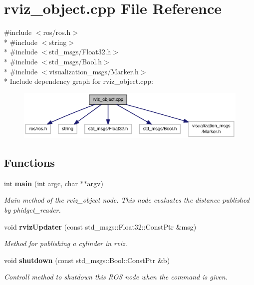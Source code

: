\section{rviz\-\_\-object.\-cpp File Reference}
\label{rviz__object_8cpp}
{\ttfamily \#include $<$ros/ros.\-h$>$}\\*
{\ttfamily \#include $<$string$>$}\\*
{\ttfamily \#include $<$std\-\_\-msgs/\-Float32.\-h$>$}\\*
{\ttfamily \#include $<$std\-\_\-msgs/\-Bool.\-h$>$}\\*
{\ttfamily \#include $<$visualization\-\_\-msgs/\-Marker.\-h$>$}\\*
Include dependency graph for rviz\-\_\-object.\-cpp\-:\nopagebreak
\begin{figure}[H]
\begin{center}
\leavevmode
\includegraphics[width=350pt]{rviz__object_8cpp__incl}
\end{center}
\end{figure}
\subsection*{Functions}
\begin{DoxyCompactItemize}
\item 
int {\bf main} (int argc, char $\ast$$\ast$argv)
\begin{DoxyCompactList}\small\item\em Main method of the rviz\-\_\-object node. This node evaluates the distance published by phidget\-\_\-reader. \end{DoxyCompactList}\item 
void {\bf rviz\-Updater} (const std\-\_\-msgs\-::\-Float32\-::\-Const\-Ptr \&msg)
\begin{DoxyCompactList}\small\item\em Method for publishing a cylinder in rviz. \end{DoxyCompactList}\item 
void {\bf shutdown} (const std\-\_\-msgs\-::\-Bool\-::\-Const\-Ptr \&b)
\begin{DoxyCompactList}\small\item\em Controll method to shutdown this R\-O\-S node when the command is given. \end{DoxyCompactList}\end{DoxyCompactItemize}
